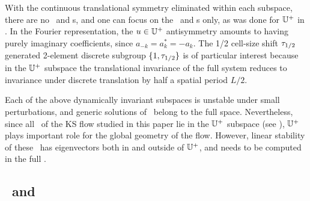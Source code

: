 \PCedit{
While in general the bilinear term $(u^2)_x$  mixes the
irreducible subspaces of $D_n$, for $D_2$ there are
four subspaces invariant under the flow\rf{KNSks90}:
\begin{romannum} %
 \item[$\{0\}$:~~~~~~] the $u(x)=0$ {\eqv}
 \item[$\bbU^+ = \bbU^{(1)}+ \bbU^{(3)} $:]
    the reflection $D_1$ irreducible space of antisymmetric $u(x)$
 \item[$\bbU^S =  \bbU^{(1)}+ \bbU^{(2)}$:]
    the shift $D_1$ irreducible space of $L/2$ shift symmetric  $u(x)$
 \item[$\bbU^{(1)}$:~~~~~]
    the $D_2$ irreducible  space of $u(x)$ invariant under $x\mapsto L/2-x,\ u\mapsto -u$
\end{romannum} %
as long as all other components of $u(x)$ are
set to zero (see for example \refeq{KSU+}).
        } %
With the continuous
translational symmetry eliminated within each subspace, there are no
\reqva\ and \rpo s, and one
can focus on the \eqva\ and \po s only, as was done
for $\mathbb{U}^+$ in .
In the Fourier
representation, the
$u \in \mathbb{U}^+$
antisymmetry amounts to having purely imaginary
coefficients, since $a_{-k}= a^\ast_k = -a_k$.
The 1/2 cell-size shift $\tau_{1/2}$
generated 2-element discrete subgroup
$\{1,\tau_{1/2}\}$ is
of particular interest
because in the $\mathbb{U}^+$ subspace the translational invariance of the full system reduces to
invariance under discrete translation  by half a
spatial period $L/2$.

Each of the above dynamically invariant subspaces is unstable
under small perturbations, and generic solutions of \KSe\ belong to
the full space.
Nevertheless, since  all \eqva\ of the KS flow studied in this paper
lie in the $\mathbb{U}^+$ subspace (see
), $\mathbb{U}^+$  plays important role for the global
geometry of the flow.
However, linear stability of these \eqva\ has
eigenvectors both in and outside of $\mathbb{U}^+$, and needs to be
computed in the full \statesp.



\subsection{\Eqva\ and \reqva} %
\label{sec:stks}


